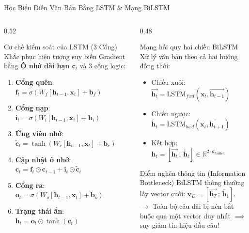 \documentclass[aspectratio=169, 10pt]{beamer}
\begin{document}
\begin{frame}{Học Biểu Diễn Văn Bản Bằng LSTM \& Mạng BiLSTM}
  \begin{columns}[c]
    \begin{column}{0.52\textwidth}
      \begin{block}{Cơ chế kiểm soát của LSTM (3 Cổng)}
        \fontsize{7.5}{9.5}\selectfont
        Khắc phục hiện tượng suy biến Gradient bằng \textbf{Ô nhớ dài hạn $\mathbf{c}_t$} và 3 cổng logic:
        \begin{enumerate}
          \item \textbf{Cổng quên}: $\mathbf{f}_t = \sigma(W_f [\mathbf{h}_{t-1}, \mathbf{x}_t] + \mathbf{b}_f)$
          \item \textbf{Cổng nạp}: $\mathbf{i}_t = \sigma(W_i [\mathbf{h}_{t-1}, \mathbf{x}_t] + \mathbf{b}_i)$
          \item \textbf{Ứng viên nhớ}: $\tilde{\mathbf{c}}_t = \tanh(W_c [\mathbf{h}_{t-1}, \mathbf{x}_t] + \mathbf{b}_c)$
          \item \textbf{Cập nhật ô nhớ}: $\mathbf{c}_t = \mathbf{f}_t \odot \mathbf{c}_{t-1} + \mathbf{i}_t \odot \tilde{\mathbf{c}}_t$
          \item \textbf{Cổng ra}: $\mathbf{o}_t = \sigma(W_o [\mathbf{h}_{t-1}, \mathbf{x}_t] + \mathbf{b}_o)$
          \item \textbf{Trạng thái ẩn}: $\mathbf{h}_t = \mathbf{o}_t \odot \tanh(\mathbf{c}_t)$
        \end{enumerate}
      \end{block}
    \end{column}

    \begin{column}{0.48\textwidth}
      \begin{block}{Mạng hồi quy hai chiều BiLSTM}
        \fontsize{7.5}{9.5}\selectfont
        Xử lý văn bản theo cả hai hướng đồng thời:
        \begin{itemize}
          \item Chiều xuôi: $\overrightarrow{\mathbf{h}_t} = \text{LSTM}_{fwd}(\mathbf{x}_t, \overrightarrow{\mathbf{h}_{t-1}})$
          \item Chiều ngược: $\overleftarrow{\mathbf{h}_t} = \text{LSTM}_{bwd}(\mathbf{x}_t, \overleftarrow{\mathbf{h}_{t+1}})$
          \item Kết hợp: $\mathbf{h}_t = [\overrightarrow{\mathbf{h}_t} \,;\, \overleftarrow{\mathbf{h}_t}] \in \mathbb{R}^{2 \cdot d_{hidden}}$
        \end{itemize}
      \end{block}

      \begin{alertblock}{Điểm nghẽn thông tin (Information Bottleneck)}
        \fontsize{7.5}{9.5}\selectfont
        BiLSTM thông thường lấy vector cuối: $\mathbf{v}_D = [\overrightarrow{\mathbf{h}_T} \,;\, \overleftarrow{\mathbf{h}_1}]$.\\
        $\to$ Toàn bộ câu dài bị nén bắt buộc qua một vector duy nhất $\implies$ suy giảm tín hiệu đầu câu!
      \end{alertblock}
    \end{column}
  \end{columns}
\end{frame}
\end{document}
